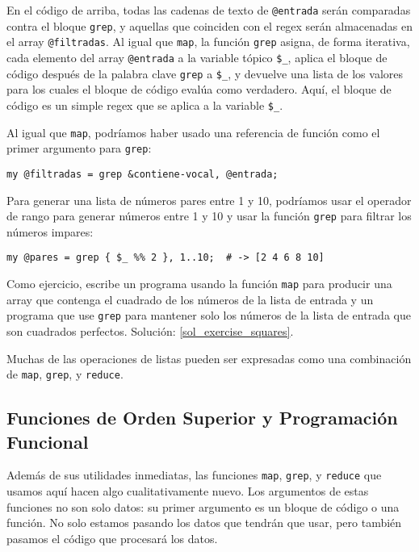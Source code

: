 En el código de arriba, todas las cadenas de texto de 
\verb|@entrada| serán comparadas contra el bloque {\tt grep},
y aquellas que coinciden con el regex serán almacenadas
en el array \verb|@filtradas|. Al igual que {\tt map},
la función {\tt grep} asigna, de forma iterativa, cada elemento
del array \verb|@entrada| a la variable tópico \verb|$_|, aplica 
el bloque de código después de la palabra clave {\tt grep} a \verb|$_|, 
y devuelve una lista de los valores para los cuales el bloque
de código evalúa como verdadero. Aquí, el bloque de código es un 
simple regex que se aplica a la variable \verb|$_|.

Al igual que {\tt map}, podríamos haber usado una referencia
de función como el primer argumento para {\tt grep}:

\begin{lstlisting}
my @filtradas = grep &contiene-vocal, @entrada;
\end{lstlisting}
%

Para generar una lista de números pares entre 1 y 10, podríamos
usar el operador de rango para generar números entre 1 y 10 y
usar la función {\tt grep} para filtrar los números impares:

\begin{lstlisting}
my @pares = grep { $_ %% 2 }, 1..10;  # -> [2 4 6 8 10]
\end{lstlisting}
%

\label{exercise_squares}
Como ejercicio, escribe un programa usando la función
{\tt map} para producir una array que contenga el cuadrado
de los números de la lista de entrada y un programa que use 
{\tt grep} para mantener solo los números de la lista de entrada
que son cuadrados perfectos. Solución: \ref{sol_exercise_squares}.

Muchas de las operaciones de listas pueden ser expresadas como una
combinación de {\tt map}, {\tt grep}, y {\tt reduce}.

\subsection{Funciones de Orden Superior y Programación Funcional}
\label{array_functional_programming}

Además de sus utilidades inmediatas, las funciones {\tt map},
{\tt grep}, y {\tt reduce} que usamos aquí  hacen algo 
cualitativamente nuevo. Los argumentos de estas funciones 
no son solo datos: su primer argumento es un bloque de
código o una función. No solo estamos pasando los datos
que tendrán que usar, pero también pasamos el código
que procesará los datos.


